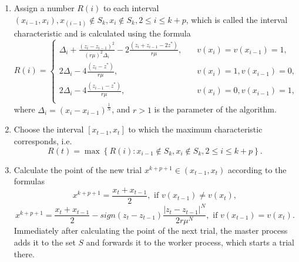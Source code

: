 \documentclass[runningheads]{llncs}
\begin{document}
\begin{enumerate}
\item Assign a number $R(i)$ to each interval $(x_{i-1}, x_i), x_(i-1) \notin S_k, x_i \notin S_k, 2 \leq i \leq k+p$, which is called the interval characteristic and is calculated using the formula
\begin{equation}\label{characteristic}
R(i)=
\begin{cases}
    \Delta_i+\frac{(z_i-z_{i-1})^2}{(r\mu)^2\Delta_i} - 2 \frac{(z_i+z_{i-1}-2z^*)}{r\mu},   & \quad v(x_i)=v(x_{i-1})=1,\\
    2\Delta_i- 4 \frac{(z_i-z^*)}{r\mu},   & \quad v(x_i)=1, v(x_{i-1})=0,\\
    2\Delta_i- 4 \frac{(z_{i-1}-z^*)}{r\mu},       & \quad v(x_i)=0, v(x_{i-1})=1,\\
\end{cases}
\end{equation}
where $\Delta_i=(x_i-x_{i-1})^\frac{1}{N}$, and $r>1$ is the parameter of the algorithm.

\item Choose the interval $[x_{t-1}, x_t]$ to which the maximum characteristic corresponds, i.e.
\[
R(t)= \max \left\{ R(i): x_{i-1} \notin S_k, x_i \notin S_k, 2 \leq i \leq k+p\right\}.
\]

\item Calculate the point of the new trial $x^{k+p+1} \in (x_{t-1}, x_t)$ according to the formulas
\begin{equation}\label{new_point_1} 
x^{k+p+1} = \frac{x_t+x_{t-1}}{2}, \text{ if } v(x_{t-1}) \neq v(x_t),
\end{equation}
\begin{equation}\label{new_point_2} 
x^{k+p+1} = \frac{x_t+x_{t-1}}{2}-\textit{sign}{(z_t-z_{t-1})}\frac{|z_t-z_{t-1}|^N}{2r\mu^N}, \text{ if } v(x_{t-1})=v(x_t).
\end{equation}
Immediately after calculating the point of the next trial, the master process adds it to the set $S$ and forwards it to the worker process, which starts a trial there.
\end{enumerate}
\end{document}
